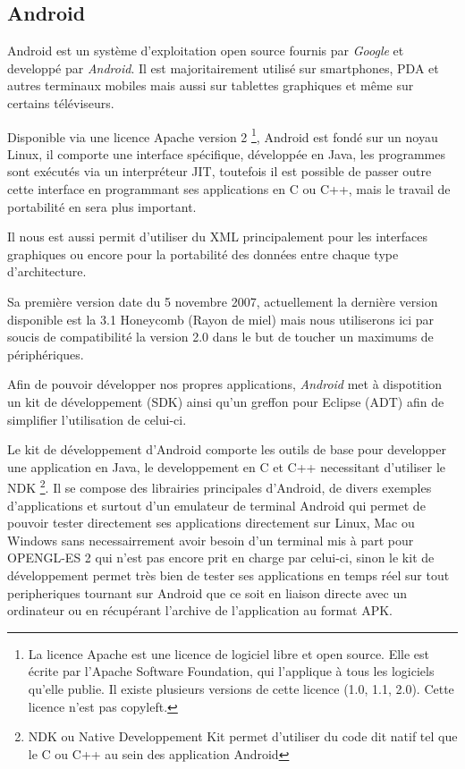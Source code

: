 \subsection{Android}

	Android est un système d'exploitation open source fournis par \emph{Google} et
	developpé par \emph{Android}.
	Il est majoritairement utilisé sur smartphones, PDA et autres terminaux
	mobiles mais aussi sur tablettes graphiques et même sur certains téléviseurs.
	
	Disponible via une licence Apache version 2 \footnote{La licence Apache est une
	licence de logiciel libre et open source. Elle est écrite par l'Apache Software
	Foundation, qui l'applique à tous les logiciels qu'elle publie. Il existe 
	plusieurs  versions de cette licence (1.0, 1.1, 2.0). Cette licence n'est  pas
	copyleft.}, Android est fondé sur un noyau Linux, il comporte une interface
	spécifique, développée en Java, les programmes sont exécutés via un
	interpréteur JIT, toutefois il est possible de passer outre cette interface en
	programmant ses applications en C ou C++, mais le travail de portabilité en
	sera plus important.
	
	Il nous est aussi permit d'utiliser du XML principalement pour les interfaces
	graphiques ou encore pour la portabilité des données entre chaque type
	d'architecture.
	
	Sa première version date du 5 novembre 2007, actuellement la dernière version
	disponible est la 3.1 Honeycomb (Rayon de miel) mais nous utiliserons ici par
	soucis de compatibilité la version 2.0 dans le but de toucher un maximums de
	périphériques.
	
	Afin de pouvoir développer nos propres applications, \emph{Android} met à
	dispotition un kit de développement (SDK) ainsi qu'un greffon pour Eclipse
	(ADT) afin de simplifier l'utilisation de celui-ci.
	
	Le kit de développement d'Android comporte les outils de base pour developper une application en
	Java, le developpement en C et C++ necessitant d'utiliser le NDK \footnote{NDK
	ou Native Developpement Kit permet d'utiliser du code dit natif tel que le C
	ou C++ au sein des application Android}.
	Il se compose des librairies principales d'Android, de divers exemples
	d'applications et surtout d'un emulateur de terminal Android qui permet de
	pouvoir tester directement ses applications directement sur Linux, Mac ou
	Windows sans necessairrement avoir besoin d'un terminal mis à part pour
	OPENGL-ES 2 qui n'est pas encore prit en charge par celui-ci, sinon le kit de développement
	permet très bien de tester ses applications en temps réel sur tout
	peripheriques tournant sur Android que ce soit en liaison directe avec un
	ordinateur ou en récupérant l'archive de l'application au format APK.
	
